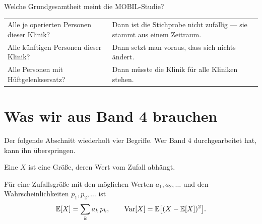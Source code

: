 \begin{warnung}
Welche Grundgesamtheit meint die MOBIL-Studie?

\begin{center}
\renewcommand{\arraystretch}{1.5}
\begin{tabular}{@{}P{3.2cm}P{5.4cm}@{}}
\toprule
Alle je operierten Personen dieser Klinik? & Dann ist die Stichprobe nicht zufällig --- sie stammt aus einem Zeitraum.\\
Alle künftigen Personen dieser Klinik? & Dann setzt man voraus, dass sich nichts ändert.\\
Alle Personen mit Hüftgelenksersatz? & Dann müsste die Klinik für alle Kliniken stehen.\\
\bottomrule
\end{tabular}
\end{center}

\begin{center}
\begin{minipage}{0.88\textwidth}
\end{minipage}
\end{center}
\end{warnung}

\section{Was wir aus Band 4 brauchen}

Der folgende Abschnitt wiederholt vier Begriffe. Wer Band 4 durchgearbeitet hat, kann ihn überspringen.

\begin{definition}
Eine  $X$ ist eine Größe, deren Wert vom Zufall abhängt.

Für eine Zufallsgröße mit den möglichen Werten $a_1, a_2, \ldots$ und den Wahrscheinlichkeiten $p_1, p_2, \ldots$ ist
\[ \mathbb{E}[X] = \sum_k a_k\,p_k , \qquad \operatorname{Var}[X] = \mathbb{E}\bigl[(X - \mathbb{E}[X])^2\bigr] . \]
\end{definition}

